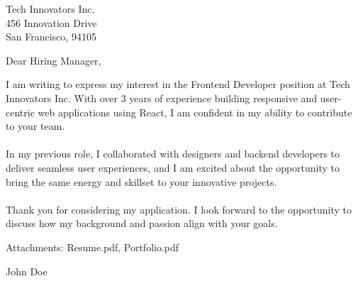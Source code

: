 \documentclass[11pt,a4paper]{letter}
\begin{document}
\begin{letter}{
Tech Innovators Inc.\\
456 Innovation Drive\\
San Francisco, 94105
}

\address{
John Doe\\
123 Main Street\\
New York, 10001\\
+1234567890\\
\href{mailto:john.doe@example.com}{john.doe@example.com}
}

\date{April 15, 2025}

\opening{Dear Hiring Manager,}

I am writing to express my interest in the Frontend Developer position at Tech Innovators Inc. With over 3 years of experience building responsive and user-centric web applications using React, I am confident in my ability to contribute to your team.\\
\\
In my previous role, I collaborated with designers and backend developers to deliver seamless user experiences, and I am excited about the opportunity to bring the same energy and skillset to your innovative projects.\\
\\
Thank you for considering my application. I look forward to the opportunity to discuss how my background and passion align with your goals.

\vspace{\baselineskip}
\noindent Attachments: Resume.pdf, Portfolio.pdf

{}{John Doe}

\end{letter}
\end{document}
